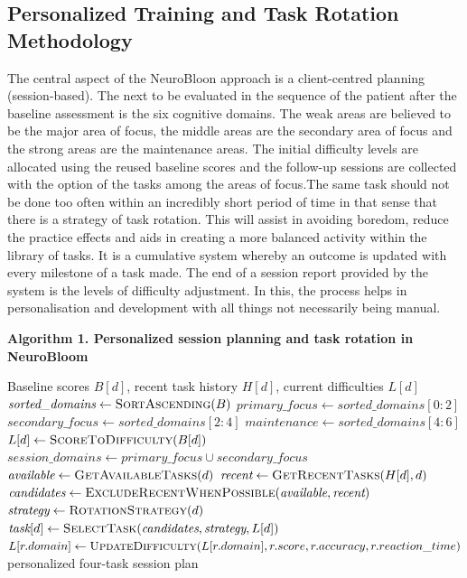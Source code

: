 \documentclass[12pt,a4paper]{report}
\begin{document}
\subsection{Personalized Training and Task Rotation Methodology}
The central aspect of the NeuroBloon approach is a client-centred planning (session-based). The next to be evaluated in the sequence of the patient after the baseline assessment is the six cognitive domains. The weak areas are believed to be the major area of focus, the middle areas are the secondary area of focus and the strong areas are the maintenance areas. The initial difficulty levels are allocated using the reused baseline scores and the follow-up sessions are collected with the option of the tasks among the areas of focus.The same task should not be done too often within an incredibly short period of time in that sense that there is a strategy of task rotation. This will assist in avoiding boredom, reduce the practice effects and aids in creating a more balanced activity within the library of tasks. It is a cumulative system whereby an outcome is updated with every milestone of a task made. The end of a session report provided by the system is the levels of difficulty adjustment. In this, the process helps in personalisation and development with all things not necessarily being manual.

\begin{center}
\begin{minipage}{0.92\linewidth}
\small
\textbf{Algorithm 1. Personalized session planning and task rotation in NeuroBloom}
\begin{algorithmic}[1]
\Require Baseline scores $B[d]$, recent task history $H[d]$, current difficulties $L[d]$
\State $\textit{sorted\_domains} \gets \Call{SortAscending}{B}$
\State $\textit{primary\_focus} \gets \textit{sorted\_domains}[0:2]$
\State $\textit{secondary\_focus} \gets \textit{sorted\_domains}[2:4]$
\State $\textit{maintenance} \gets \textit{sorted\_domains}[4:6]$
    \State $L[d] \gets \Call{ScoreToDifficulty}{B[d]}$
\EndFor
\State $\textit{session\_domains} \gets \textit{primary\_focus} \cup \textit{secondary\_focus}$
    \State $\textit{available} \gets \Call{GetAvailableTasks}{d}$
    \State $\textit{recent} \gets \Call{GetRecentTasks}{H[d], d}$
    \State $\textit{candidates} \gets \Call{ExcludeRecentWhenPossible}{\textit{available}, \textit{recent}}$
    \State $\textit{strategy} \gets \Call{RotationStrategy}{d}$
    \State $\textit{task}[d] \gets \Call{SelectTask}{\textit{candidates}, \textit{strategy}, L[d]}$
\EndFor
{}
    \State {}
    \State $L[r.domain] \gets \Call{UpdateDifficulty}{L[r.domain], r.score, r.accuracy, r.reaction\_time}$
\EndFor
{}
    \State {}
\EndIf
\State \Return personalized four-task session plan
\end{algorithmic}
\end{minipage}
\end{center}
\end{document}
